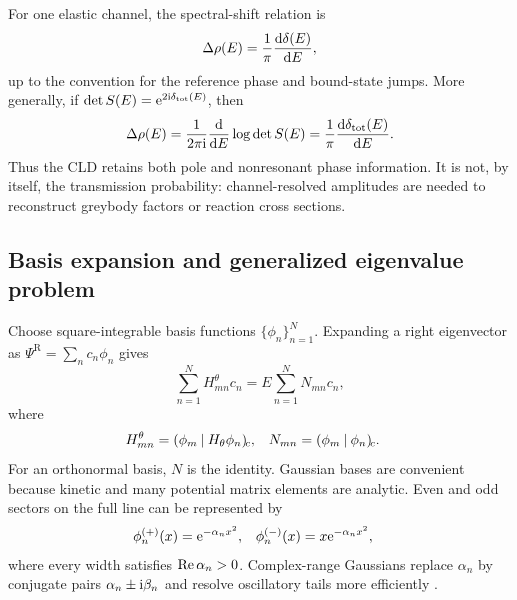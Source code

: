 For one elastic channel, the spectral-shift relation is
\begin{equation}
  \Delta\rho(E)=\frac{1}{\pi}
  \frac{\mathrm{d}\delta(E)}{\mathrm{d} E} ,
  \label{eq:cld-phase}
\end{equation}
up to the convention for the reference phase and bound-state jumps.  More
generally, if $\det S(E)=\mathrm{e}^{2\mathrm{i}\delta_{\mathrm{tot}}(E)}$, then
\begin{equation}
  \Delta\rho(E)
  =\frac{1}{2\pi\mathrm{i}}
  \frac{\mathrm{d}}{\mathrm{d} E}\log\det S(E)
  =\frac{1}{\pi}
  \frac{\mathrm{d}\delta_{\mathrm{tot}}(E)}{\mathrm{d} E} .
  \label{eq:birman-krein-differential}
\end{equation}
Thus the CLD retains both pole and nonresonant phase information.  It is not,
by itself, the transmission probability: channel-resolved amplitudes are
needed to reconstruct greybody factors or reaction cross sections.

\subsection{Basis expansion and generalized eigenvalue problem}
\label{subsec:csm-basis}

Choose square-integrable basis functions $\{\phi_n\}_{n=1}^{N}$.  Expanding a
right eigenvector as $\Psi^{\mathrm R}=\sum_n c_n\phi_n$ gives
\begin{equation}
  \sum_{n=1}^{N}H_{mn}^{\theta}c_n
  =E\sum_{n=1}^{N}N_{mn}c_n ,
  \label{eq:generalized-eigenproblem}
\end{equation}
where
\begin{align}
  H_{mn}^{\theta}&=(\phi_m\mathbin{|}H_\theta\phi_n)_{\!c},
  &N_{mn}&=(\phi_m\mathbin{|}\phi_n)_{\!c} .
  \label{eq:csm-matrices}
\end{align}
For an orthonormal basis, $N$ is the identity.  Gaussian bases are convenient
because kinetic and many potential matrix elements are analytic.  Even and
odd sectors on the full line can be represented by
\begin{align}
  \phi_n^{(+)}(x)&=\mathrm{e}^{-\alpha_nx^2},
  &\phi_n^{(-)}(x)&=x\mathrm{e}^{-\alpha_nx^2},
  \label{eq:real-gaussian-basis}
\end{align}
where every width satisfies $\operatorname{Re}\alpha_n>0$.  Complex-range Gaussians replace
$\alpha_n$ by conjugate pairs $\alpha_n\pm\mathrm{i}\beta_n$ and resolve oscillatory
tails more efficiently
\cite{Hiyama:2003cu,Myo:2014ypa,Ogawa:2026veu}.

